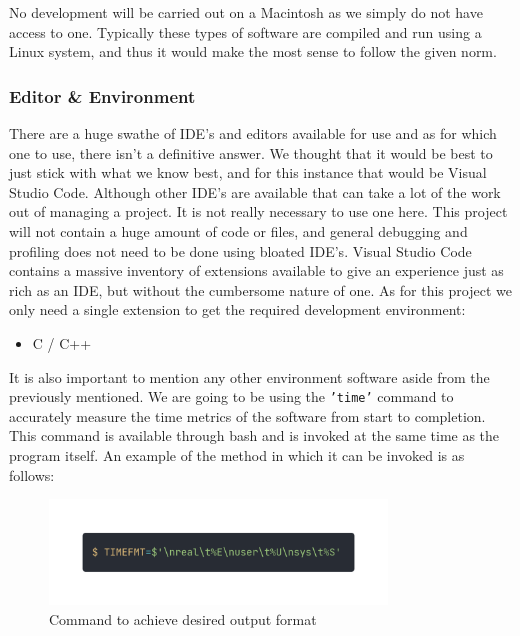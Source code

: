 \documentclass{article}
\begin{document}
No development will be carried out on a Macintosh as we simply do not have access to one. Typically these types of software are compiled and run using a Linux system, and thus it would make the most sense to follow the given norm.

\subsubsection{Editor \& Environment}
There are a huge swathe of IDE's and editors available for use and as for which one to use, there isn't a definitive answer. We thought that it would be best to just stick with what we know best, and for this instance that would be Visual Studio Code. Although other IDE's are available that can take a lot of the work out of managing a project. It is not really necessary to use one here. This project will not contain a huge amount of code or files, and general debugging and profiling does not need to be done using bloated IDE's. Visual Studio Code contains a massive inventory of extensions available to give an experience just as rich as an IDE, but without the cumbersome nature of one. As for this project we only need a single extension to get the required development environment:

\begin{itemize}
    \item C / C++
\end{itemize}

It is also important to mention any other environment software aside from the previously mentioned. We are going to be using the \texttt{'time'} command to accurately measure the time metrics of the software from start to completion. This command is available through bash and is invoked at the same time as the program itself. An example of the method in which it can be invoked is as follows:

\begin{figure}[h]
    \centering
    \includegraphics[width=0.8\textwidth]{time_command_format.png}
    \caption{Command to achieve desired output format}
\end{figure}
\end{document}
